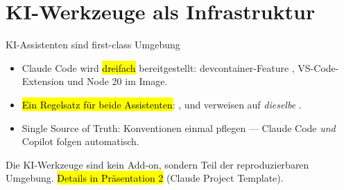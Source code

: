 \documentclass[aspectratio=169,11pt]{beamer}
\begin{document}
\section{KI-Werkzeuge als Infrastruktur}
\begin{frame}{KI-Assistenten sind first-class Umgebung}
  \begin{itemize}
    \item Claude Code wird \hl{dreifach} bereitgestellt:
          devcontainer-Feature ,
          VS-Code-Extension und Node 20 im Image.
    \item \hl{Ein Regelsatz für beide Assistenten}: ,
           und 
          verweisen auf \emph{dieselbe} .
    \item Single Source of Truth: Konventionen einmal pflegen ---
          Claude Code \emph{und} Copilot folgen automatisch.
  \end{itemize}
  \vfill
  \begin{takeaway}[Brücke]
    Die KI-Werkzeuge sind kein Add-on, sondern Teil der reproduzierbaren
    Umgebung. \hl{Details in Präsentation 2} (Claude Project Template).
  \end{takeaway}
\end{frame}

\end{document}
